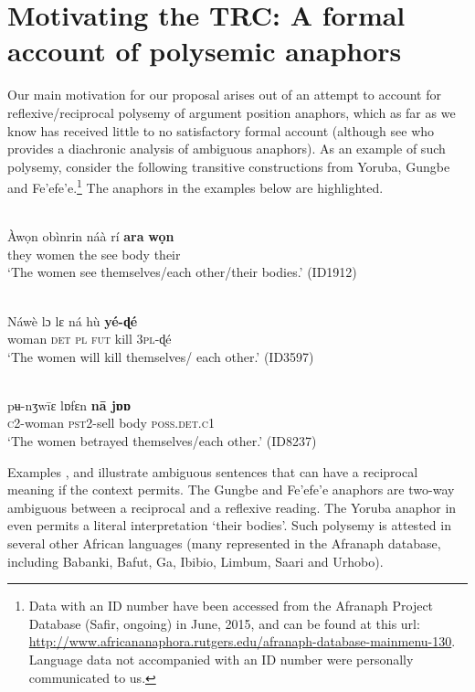 \documentclass[output=paper]{langsci/langscibook}
\begin{document}
\section{Motivating the TRC: A formal account of polysemic anaphors}



Our main motivation for our proposal arises out of an attempt to account for reflexive/reciprocal polysemy of argument position anaphors, which as far as we know has received little to no satisfactory formal account (although see \citealt{Heine1999} who provides a diachronic analysis of ambiguous anaphors). As an example of such polysemy, consider the following transitive constructions from Yoruba, Gungbe and Fe'efe'e.\footnote{Data with an ID number have been accessed from the Afranaph Project Database (Safir, ongoing) in June, 2015, and can be found at this url: \url{http://www.africananaphora.rutgers.edu/afranaph-database-mainmenu-130}. Language data not accompanied with an ID number were personally communicated to us.} The anaphors in the examples below are highlighted.




\ea\label{ex:}
 \\
\gll Àwọn     obìnrin   náà  rí   \textbf{{ara}}   \textbf{{wọn}} \\
they     women   the   see   body   their\\
\glt  ‘The women see themselves/each other/their bodies.’ {(ID1912)}
\z


\ea\label{ex:}
 \\
\gll Náwè     lɔ  lɛ  ná  hù  \textbf{yé-ɖé} \\
woman    \textsc{det}  \textsc{pl}  \textsc{fut}  kill  \textsc{3pl}-ɖé \\
\glt ‘The women will kill themselves/ each other.’ (ID3597) 
\z


\ea\label{ex:}
 \\
\gll pʉ-nʒw\={i}ɛ   lɒfɛn     \textbf{n\={a}   jɒɒ} \\
\textsc{c}{2-woman}   {\textsc{pst2}}-sell   body   \textsc{poss.det.c1}\\
\glt ‘The women betrayed themselves/each other.’ {(ID8237)} 
\z


Examples ,  and  illustrate ambiguous sentences that can have a reciprocal meaning if the context permits. The Gungbe and Fe'efe'e anaphors are two-way ambiguous between a reciprocal and a reflexive reading. The Yoruba anaphor in  even permits a literal interpretation ‘their bodies’. Such polysemy is attested in several other African languages (many represented in the Afranaph database, including Babanki, Bafut, Ga, Ibibio, Limbum, Saari and Urhobo).
\end{document}
